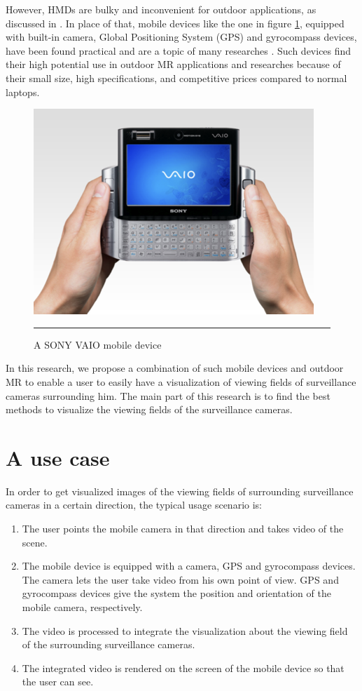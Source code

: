 However, HMDs are bulky and inconvenient for outdoor applications, as discussed in \citep{Reference2} \citep{Reference4}. In place of that, mobile devices like the one in figure \ref{fig:VAIO}, equipped with built-in camera, Global Positioning System (GPS) and gyrocompass devices, have been found practical and are a topic of many researches \citep{Reference2} \citep{Reference4}. Such devices find their high potential use in outdoor MR applications and researches because of their small size, high specifications, and competitive prices compared to normal laptops.

\begin{figure}[htbp]
  \centering
    \includegraphics{./Primitives/vaio.png}
    \rule{35em}{0.5pt}
  \caption[A SONY VAIO mobile device]{A SONY VAIO mobile device}
  \label{fig:VAIO}
\end{figure}

In this research, we propose a combination of such mobile devices and outdoor MR to enable a user to easily have a visualization of viewing fields of surveillance cameras surrounding him. The main part of this research is to find the best methods to visualize the viewing fields of the surveillance cameras.

\section{A use case}

In order to get visualized images of the viewing fields of surrounding surveillance cameras in a certain direction, the typical usage scenario is:

\begin{enumerate}
\item The user points the mobile camera in that direction and takes video of the scene.
\item The mobile device is equipped with a camera, GPS and gyrocompass devices. The camera lets the user take video from his own point of view. GPS and gyrocompass devices give the system the position and orientation of the mobile camera, respectively.
\item The video is processed to integrate the visualization about the viewing field of the surrounding surveillance cameras.
\item The integrated video is rendered on the screen of the mobile device so that the user can see.
\end{enumerate}

